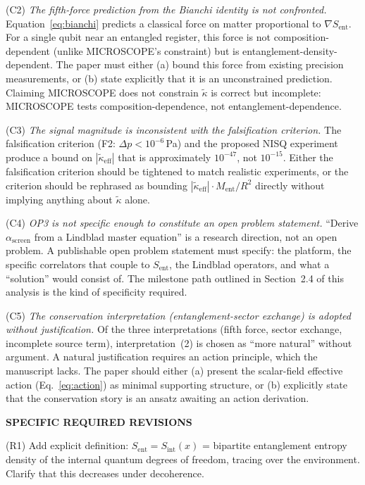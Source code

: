 \documentclass[12pt,letterpaper]{article}
\theoremstyle{plain}
\theoremstyle{definition}
\theoremstyle{remark}
\newcommand{\kt}{\tilde{\kappa}}
\newcommand{\kteff}{\tilde{\kappa}_{\mathrm{eff}}}
\newcommand{\Sent}{S_{\mathrm{ent}}}
\newcommand{\Ment}{M_{\mathrm{ent}}}
\newcommand{\asc}{\alpha_{\mathrm{screen}}}
\begin{document}
\begin{mdframed}[backgroundcolor=boxgray,linewidth=1pt]
(C2) \textit{The fifth-force prediction from the Bianchi identity is not confronted.}
Equation~\eqref{eq:bianchi} predicts a classical force on matter proportional to $\nabla\Sent$.
For a single qubit near an entangled register, this force is not composition-dependent
(unlike MICROSCOPE's constraint) but is entanglement-density-dependent.  The paper must
either (a) bound this force from existing precision measurements, or (b) state explicitly
that it is an unconstrained prediction.  Claiming MICROSCOPE does not constrain $\kt$ is
correct but incomplete: MICROSCOPE tests composition-dependence, not entanglement-dependence.

(C3) \textit{The signal magnitude is inconsistent with the falsification criterion.}
The falsification criterion (F2: $\Delta p < 10^{-6}$\,Pa) and the proposed NISQ
experiment produce a bound on $|\kteff|$ that is approximately $10^{-47}$, not $10^{-15}$.
Either the falsification criterion should be tightened to match realistic experiments,
or the criterion should be rephrased as bounding $|\kteff|\cdot\Ment/R^2$ directly
without implying anything about $\kt$ alone.

(C4) \textit{OP3 is not specific enough to constitute an open problem statement.}
``Derive $\asc$ from a Lindblad master equation'' is a research direction, not an open
problem.  A publishable open problem statement must specify: the platform, the specific
correlators that couple to $\Sent$, the Lindblad operators, and what a ``solution''
would consist of.  The milestone path outlined in Section~2.4 of this analysis
is the kind of specificity required.

(C5) \textit{The conservation interpretation (entanglement-sector exchange) is adopted
without justification.}  Of the three interpretations (fifth force, sector exchange,
incomplete source term), interpretation~(2) is chosen as ``more natural'' without
argument.  A natural justification requires an action principle, which the manuscript
lacks.  The paper should either (a) present the scalar-field effective action
(Eq.~\eqref{eq:action}) as minimal supporting structure, or (b) explicitly state that
the conservation story is an ansatz awaiting an action derivation.

\medskip\noindent\textbf{SPECIFIC REQUIRED REVISIONS}

(R1) Add explicit definition: $\Sent = S_{\mathrm{int}}(x)$ = bipartite entanglement entropy
density of the internal quantum degrees of freedom, tracing over the environment.  Clarify
that this decreases under decoherence.


\end{mdframed}
\end{document}

